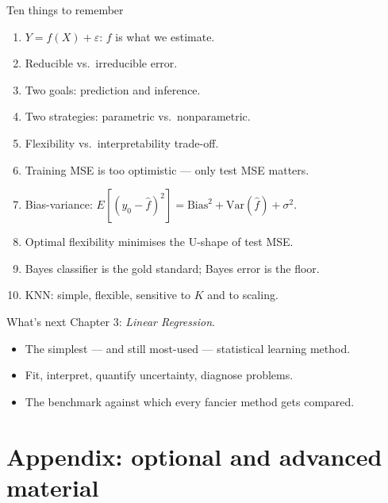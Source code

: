 \documentclass[aspectratio=169,11pt]{beamer}
\begin{document}
\begin{frame}{Ten things to remember}
  \begin{enumerate}
    \item $Y = f(X) + \varepsilon$: $f$ is what we estimate.
    \item Reducible vs.\ irreducible error.
    \item Two goals: prediction and inference.
    \item Two strategies: parametric vs.\ nonparametric.
    \item Flexibility vs.\ interpretability trade-off.
    \item Training MSE is too optimistic --- only test MSE matters.
    \item Bias-variance: $E[(y_0 - \hat f)^2] = \mathrm{Bias}^2 +
          \mathrm{Var}(\hat f) + \sigma^2$.
    \item Optimal flexibility minimises the U-shape of test MSE.
    \item Bayes classifier is the gold standard; Bayes error is the
          floor.
    \item KNN: simple, flexible, sensitive to $K$ and to scaling.
  \end{enumerate}
\end{frame}

\begin{frame}{What's next}
  Chapter 3: \emph{Linear Regression}.
  \begin{itemize}
    \item The simplest --- and still most-used --- statistical learning
          method.
    \item Fit, interpret, quantify uncertainty, diagnose problems.
    \item The benchmark against which every fancier method gets
          compared.
  \end{itemize}
\end{frame}


\appendix
\AtBeginSection[]{}
\section{Appendix: optional and advanced material}
\end{document}
